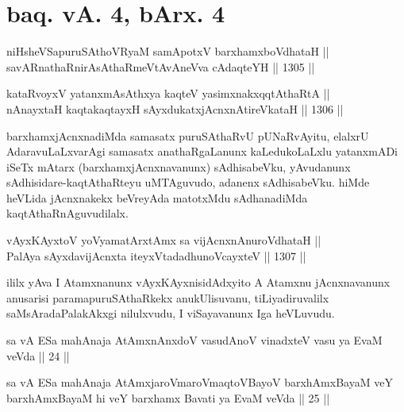\section*{baq. vA. 4, bArx. 4}


\begin{shl}	
niHsheVSapuruSAthoVR\s yaM samApotxV barxhamxboVdhataH || \\
savARnathaRnirAsAthaRmeVtAvAneVva cA\s \s daqteYH ||  1305 ||  
\end{shl}
				
\begin{shl}
kataRvoyxV yatanxmAsAthxya kaqteV yasimxnakxqqtAthaRtA || \\
nAnayxtaH kaqtakaqtayxH sAyxdukatxjAcnxnAtireVkataH ||  1306 ||  
\end{shl}

\begin{artha}
barxhamxjAcnxnadiMda samasatx puruSAthaRvU pUNaRvAyitu, elalxrU AdaravuLaLxvarAgi samasatx anathaRgaLanunx kaLedukoLaLxlu yatanxmADi iSeTx mAtarx (barxhamxjAcnxnavanunx) sAdhisabeVku, yAvudanunx sAdhisidare-kaqtAthaRteyu uMTAguvudo, adanenx sAdhisabeVku. hiMde heVLida jAcnxnakekx beVreyAda matotxMdu sAdhanadiMda kaqtAthaRnAguvudilalx.
\end{artha}



\begin{shl}
vAyxKAyxtoV yoV\s yamatArx\s \s tAmx sa vijAcnxnAnuroVdhataH || \\
PalAya sAyxdavijAcnxta iteyxVtadadhunoVcayxteV ||  1307 ||  
\end{shl}

\begin{artha}
ililx yAva I Atamxnanunx vAyxKAyxnisidAdxyito A Atamxnu jAcnxnavanunx anusarisi paramapuruSAthaRkekx anukUlisuvanu, tiLiyadiruvalilx saMsAradaPalakAkxgi nilulxvudu, I viSayavanunx Iga heVLuvudu.
\end{artha}

\begin{shl}
sa vA ESa mahAnaja AtAmxnAnxdoV vasudAnoV vinadxteV vasu ya EvaM veVda || 24 ||
\end{shl}

\begin{shl}
sa vA ESa mahAnaja AtAmxjaroV\s maroV\s maqtoV\s BayoV barxhAmxBayaM veY barxhAmxBayaM hi veY barxhamx Bavati ya EvaM veVda || 25 ||
\end{shl}

